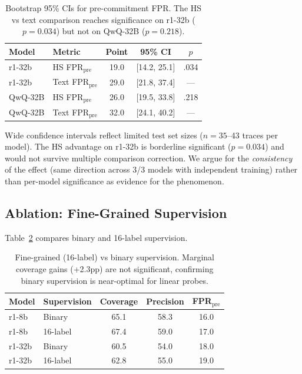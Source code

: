 \documentclass[11pt,a4paper]{article}
\begin{document}
\begin{table}[t]
\centering
\small
\caption{Bootstrap 95\% CIs for pre-commitment FPR. The HS vs text comparison reaches significance on r1-32b ($p=0.034$) but not on QwQ-32B ($p=0.218$).}
\label{tab:bootstrap}
\begin{tabular}{llccc}
\toprule
Model & Metric & Point & 95\% CI & $p$ \\
\midrule
r1-32b & HS FPR$_\text{pre}$ & 19.0 & [14.2, 25.1] & .034 \\
r1-32b & Text FPR$_\text{pre}$ & 29.0 & [21.8, 37.4] & --- \\
QwQ-32B & HS FPR$_\text{pre}$ & 26.0 & [19.5, 33.8] & .218 \\
QwQ-32B & Text FPR$_\text{pre}$ & 32.0 & [24.1, 40.2] & --- \\
\bottomrule
\end{tabular}
\end{table}

Wide confidence intervals reflect limited test set sizes ($n=35$--43 traces per model). The HS advantage on r1-32b is borderline significant ($p=0.034$) and would not survive multiple comparison correction. We argue for the \emph{consistency} of the effect (same direction across 3/3 models with independent training) rather than per-model significance as evidence for the phenomenon.

\subsection{Ablation: Fine-Grained Supervision}

Table~\ref{tab:finegrain} compares binary and 16-label supervision.

\begin{table}[t]
\centering
\small
\caption{Fine-grained (16-label) vs binary supervision. Marginal coverage gains (+2.3pp) are not significant, confirming binary supervision is near-optimal for linear probes.}
\label{tab:finegrain}
\begin{tabular}{llccc}
\toprule
Model & Supervision & Coverage & Precision & FPR$_\text{pre}$ \\
\midrule
r1-8b & Binary & 65.1 & 58.3 & 16.0 \\
r1-8b & 16-label & 67.4 & 59.0 & 17.0 \\
r1-32b & Binary & 60.5 & 54.0 & 18.0 \\
r1-32b & 16-label & 62.8 & 55.0 & 19.0 \\
\bottomrule
\end{tabular}
\end{table}
\end{document}
